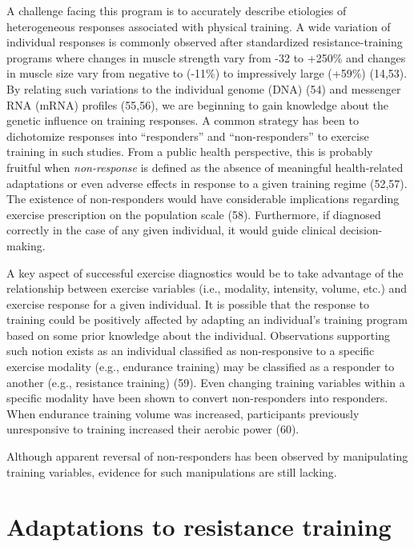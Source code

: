 \documentclass[twoside,10pt]{gihclass} %
\begin{document}
A challenge facing this program is to accurately describe etiologies of heterogeneous responses associated with physical training. A wide variation of individual responses is commonly observed after standardized resistance-training programs where changes in muscle strength vary from -32 to +250\% and changes in muscle size vary from negative to (-11\%) to impressively large (+59\%)
(14,53).
By relating such variations to the individual genome (DNA)
(54)
and messenger RNA (mRNA) profiles
(55,56),
we are beginning to gain knowledge about the genetic influence on training responses.
A common strategy has been to dichotomize responses into ``responders'' and ``non-responders'' to exercise training in such studies.
From a public health perspective, this is probably fruitful when \emph{non-response} is defined as the absence of meaningful health-related adaptations or even adverse effects in response to a given training regime
(52,57).
The existence of non-responders would have considerable implications regarding exercise prescription on the population scale
(58).
Furthermore, if diagnosed correctly in the case of any given individual, it would guide clinical decision-making.

A key aspect of successful exercise diagnostics would be to take advantage of the relationship between exercise variables (i.e., modality, intensity, volume, etc.) and exercise response for a given individual.
It is possible that the response to training could be positively affected by adapting an individual's training program based on some prior knowledge about the individual.
Observations supporting such notion exists as an individual classified as non-responsive to a specific exercise modality (e.g., endurance training) may be classified as a responder to another (e.g., resistance training)
(59).
Even changing training variables within a specific modality have been shown to convert non-responders into responders. When endurance training volume was increased, participants previously unresponsive to training increased their aerobic power
(60).

Although apparent reversal of non-responders has been observed by manipulating training variables, evidence for such manipulations are still lacking.

\hypertarget{adaptations-to-resistance-training}{%
\section{Adaptations to resistance training}\label{adaptations-to-resistance-training}}
\end{document}
